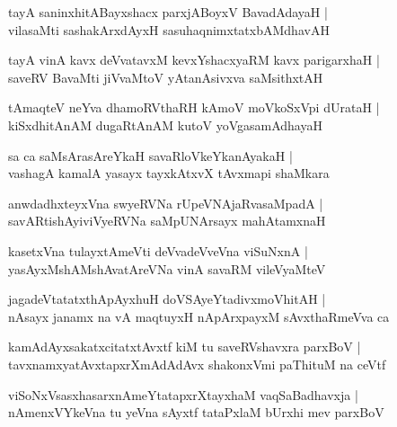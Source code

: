\documentclass[twoside,12pt,openright]{book}
\newcounter{shloka}[chapter]
\begin{document}
\begin{shloka}%
tayA saninxhitABayxshacx parxjABoyxV BavadAdayaH |\\
vilasaMti sashakArxdAyxH sasuhaqnimxtatxbAMdhavAH 
\end{shloka}

\begin{shloka}%
tayA vinA kavx deVvatavxM kevxYshacxyaRM kavx parigarxhaH |\\
saveRV BavaMti jiVvaMtoV yAtanAsivxva saMsithxtAH 
\end{shloka}

\begin{shloka}%
tAmaqteV neYva dhamoRVthaRH kAmoV moVkoSxVpi dUrataH |\\
kiSxdhitAnAM dugaRtAnAM kutoV yoVgasamAdhayaH 
\end{shloka}

\begin{shloka}%
sa ca saMsArasAreYkaH savaRloVkeYkanAyakaH |\\
vashagA kamalA yasayx tayxkAtxvX tAvxmapi shaMkara
\end{shloka}

\begin{shloka}%
anwdadhxteyxVna swyeRVNa rUpeVNAjaRvasaMpadA |\\
savARtishAyiviVyeRVNa saMpUNArsayx mahAtamxnaH 
\end{shloka}

\begin{shloka}%
kasetxVna tulayxtAmeVti deVvadeVveVna viSuNxnA |\\
yasAyxMshAMshAvatAreVNa vinA savaRM vileVyaMteV 
\end{shloka}

\begin{shloka}%
jagadeVtatatxthApAyxhuH doVSAyeYtadivxmoVhitAH |\\
nAsayx janamx na vA maqtuyxH nApArxpayxM sAvxthaRmeVva ca 
\end{shloka}

\begin{shloka}%
kamAdAyxsakatxcitatxtAvxtf kiM tu saveRVshavxra parxBoV |\\
tavxnamxyatAvxtapxrXmAdAdAvx shakonxVmi paThituM na ceVtf
\end{shloka}

\begin{shloka}%
viSoNxVsasxhasarxnAmeYtatapxrXtayxhaM vaqSaBadhavxja |\\
nAmenxVYkeVna tu yeVna sAyxtf tataPxlaM bUrxhi mev parxBoV 
\end{shloka}
\end{document}
